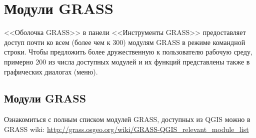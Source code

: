 \chapter{Модули GRASS}\label{appdx_grass_toolbox_modules}


<<Оболочка GRASS>> в панели <<Инструменты GRASS>> предоставляет доступ почти ко всем
(более чем к 300) модулям GRASS в режиме командной строки. Чтобы предложить
более дружественную к пользователю рабочую среду, примерно 200 из числа
доступных модулей и их функций представлены также в графических диалогах
(меню).

\section{Модули GRASS}

Ознакомиться с полным списком модулей GRASS, доступных из QGIS можно в
GRASS wiki:
\url{http://grass.osgeo.org/wiki/GRASS-QGIS_relevant_module_list}

